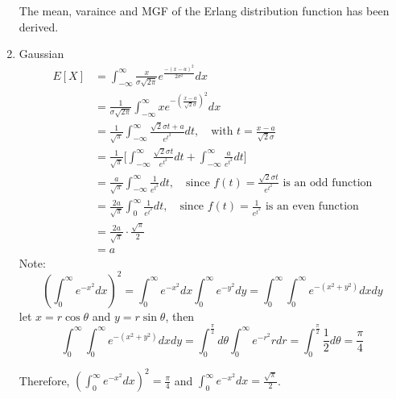 \documentclass[UTF8]{article}
\begin{document}
\begin{enumerate}
            The mean, varaince and MGF of the Erlang distribution function has been derived.
            \item Gaussian
            \begin{equation*}
                \begin{split}
                    E[X] &= \int_{-\infty}^\infty\frac{x}{\sigma\sqrt{2\pi}}e^{\frac{-(x-a)^2}{2\sigma^2}}dx\\
                    &=\frac{1}{\sigma\sqrt{2\pi}}\int^\infty_{-\infty}xe^{-(\frac{x-a}{\sqrt{2}\sigma})^2}dx \\
                    &=\frac{1}{\sqrt{\pi}}\int^\infty_{-\infty}\frac{\sqrt{2}\sigma t+a}{e^{t^2}}dt,\quad\text{with $t=\frac{x-a}{\sqrt{2}\sigma}$}\\
                    &=\frac{1}{\sqrt{\pi}}\bigg[\int^\infty_{-\infty}\frac{\sqrt{2}\sigma t}{e^{t^2}}dt+\int^\infty_{-\infty}\frac{a}{e^{t^2}}dt\bigg]\\
                    &=\frac{a}{\sqrt{\pi}}\int^\infty_{-\infty}\frac{1}{e^{t^2}}dt,\quad\text{since $f(t)=\frac{\sqrt{2}\sigma t}{e^{t^2}}$ is an odd function}\\
                    &=\frac{2a}{\sqrt{\pi}}\int^\infty_0\frac{1}{e^{t^2}}dt,\quad\text{since $f(t)=\frac{1}{e^{t^2}}$ is an even function}\\
                    &=\frac{2a}{\sqrt{\pi}}\cdot\frac{\sqrt{\pi}}{2}\\
                    &=a
                \end{split}
            \end{equation*}
            Note:
            \begin{equation*}
                (\int^\infty_0e^{-x^2}dx)^2=\int^\infty_0e^{-x^2}dx\int^\infty_0e^{-y^2}dy=\int^\infty_0\int^\infty_0e^{-(x^2+y^2)}dxdy
            \end{equation*}
            let $x=r\cos\theta$ and $y=r\sin\theta$, then
            \begin{equation*}
                \int^\infty_0\int^\infty_0e^{-(x^2+y^2)}dxdy=\int^{\frac{\pi}{2}}_0d\theta\int^\infty_0e^{-r^2}rdr=\int^{\frac{\pi}{2}}_0\frac{1}{2}d\theta=\frac{\pi}{4}
            \end{equation*}
            
            Therefore, $(\int^\infty_0e^{-x^2}dx)^2=\frac{\pi}{4}$ and $\int^\infty_0e^{-x^2}dx=\frac{\sqrt{\pi}}{2}$.


\end{enumerate}
\end{document}
